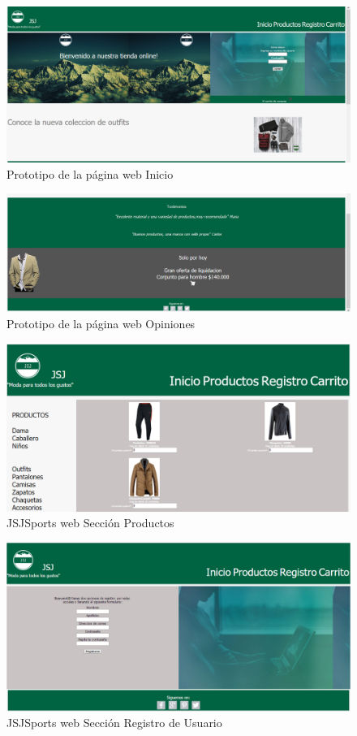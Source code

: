 \begin{figure}[th!]
	\centering
	\includegraphics[width=1.0\linewidth]{conclusiones/imagenes/paginaWeb}
	\caption{Prototipo de la página web Inicio}
	
\end{figure}

\begin{figure}[th!]
	\centering
	\includegraphics[width=1.0\linewidth]{conclusiones/imagenes/paginaWeb2}
	\caption{Prototipo de la página web Opiniones}
	
\end{figure}


\begin{figure}[th!]
	\centering
	\includegraphics[width=0.7\linewidth]{conclusiones/imagenes/ProductosPaginaJSJ}
	\caption{JSJSports web Sección Productos}
\end{figure}

\begin{figure}[th!]
	\centering
	\includegraphics[width=0.7\linewidth]{conclusiones/imagenes/RegistroPaginaJSJ}
	\caption{JSJSports web Sección Registro de Usuario}
\end{figure}

